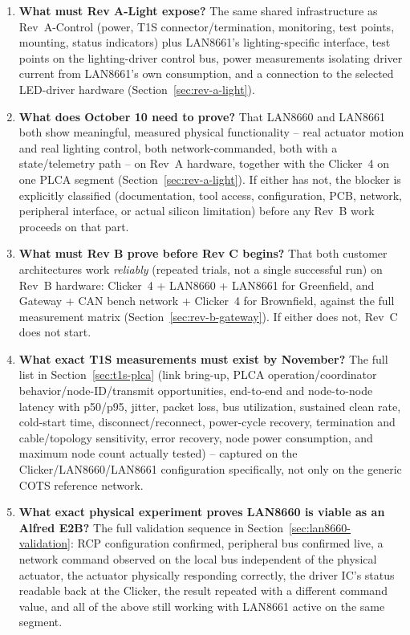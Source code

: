 \begin{enumerate}[itemsep=0.4em]
\item \textbf{What must Rev A-Light expose?}
The same shared infrastructure as Rev~A-Control (power, T1S connector/termination, monitoring, test points, mounting, status indicators) plus LAN8661's lighting-specific interface, test points on the lighting-driver control bus, power measurements isolating driver current from LAN8661's own consumption, and a connection to the selected LED-driver hardware (Section~\ref{sec:rev-a-light}).

\item \textbf{What does October 10 need to prove?}
That LAN8660 and LAN8661 both show meaningful, measured physical functionality -- real actuator motion and real lighting control, both network-commanded, both with a state/telemetry path -- on Rev~A hardware, together with the Clicker~4 on one PLCA segment (Section~\ref{sec:rev-a-light}). If either has not, the blocker is explicitly classified (documentation, tool access, configuration, PCB, network, peripheral interface, or actual silicon limitation) before any Rev~B work proceeds on that part.

\item \textbf{What must Rev B prove before Rev C begins?}
That both customer architectures work \emph{reliably} (repeated trials, not a single successful run) on Rev~B hardware: Clicker~4 + LAN8660 + LAN8661 for Greenfield, and Gateway + CAN bench network + Clicker~4 for Brownfield, against the full measurement matrix (Section~\ref{sec:rev-b-gateway}). If either does not, Rev~C does not start.

\item \textbf{What exact T1S measurements must exist by November?}
The full list in Section~\ref{sec:t1s-plca} (link bring-up, PLCA operation/coordinator behavior/node-ID/transmit opportunities, end-to-end and node-to-node latency with p50/p95, jitter, packet loss, bus utilization, sustained clean rate, cold-start time, disconnect/reconnect, power-cycle recovery, termination and cable/topology sensitivity, error recovery, node power consumption, and maximum node count actually tested) -- captured on the Clicker/LAN8660/LAN8661 configuration specifically, not only on the generic COTS reference network.

\item \textbf{What exact physical experiment proves LAN8660 is viable as an Alfred E2B?}
The full validation sequence in Section~\ref{sec:lan8660-validation}: RCP configuration confirmed, peripheral bus confirmed live, a network command observed on the local bus independent of the physical actuator, the actuator physically responding correctly, the driver IC's status readable back at the Clicker, the result repeated with a different command value, and all of the above still working with LAN8661 active on the same segment.


\end{enumerate}
